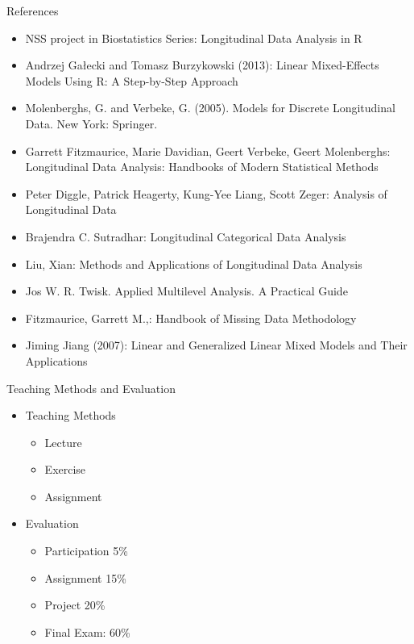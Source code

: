\documentclass{beamer}
\begin{document}
\begin{frame}{References}
\begin{itemize}
\item NSS project in Biostatistics Series: Longitudinal Data Analysis in R 
\item Andrzej Gałecki  and Tomasz Burzykowski (2013): Linear Mixed-Effects Models Using R: A Step-by-Step Approach
\item Molenberghs, G. and Verbeke, G. (2005). Models for Discrete Longitudinal Data. New York: Springer.
\item Garrett Fitzmaurice, Marie Davidian, Geert Verbeke, Geert Molenberghs: Longitudinal Data Analysis: Handbooks of Modern Statistical Methods
\item Peter Diggle, Patrick Heagerty, Kung-Yee Liang, Scott Zeger: Analysis of Longitudinal Data
\item Brajendra C. Sutradhar: Longitudinal Categorical Data Analysis
\item Liu, Xian: Methods and Applications of Longitudinal Data Analysis
\item Jos W. R. Twisk. Applied Multilevel Analysis. A Practical Guide
\item Fitzmaurice, Garrett M.,: Handbook of Missing Data Methodology
\item Jiming Jiang (2007): Linear and Generalized Linear Mixed Models and Their Applications
\end{itemize}
\end{frame}

\begin{frame}{Teaching Methods and Evaluation}
\begin{itemize}
\item Teaching Methods \vspace{0.25cm}
\begin{itemize}
\item Lecture \vspace{0.25cm}
\item Exercise \vspace{0.25cm}
\item Assignment \vspace{0.25cm}
\end{itemize}
\item Evaluation \vspace{0.25cm}
\begin{itemize}
\item Participation 5\% \vspace{0.25cm}
\item Assignment 15\% \vspace{0.25cm}
\item Project 20\% \vspace{0.25cm}  
\item Final Exam: 60\% \vspace{0.25cm}
\end{itemize}
\end{itemize}
\end{frame}
\end{document}
